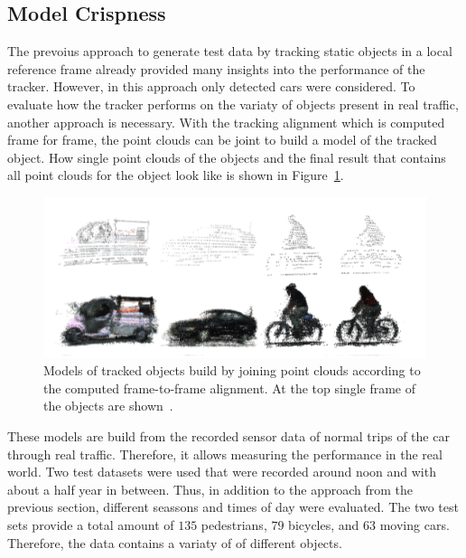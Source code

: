 \documentclass[twoside,a4paper,article]{combine}
\begin{document}
\subsection{Model Crispness}
\label{sub:model-crispness}
The prevoius approach to generate test data by tracking static
objects in a local reference frame already provided many insights into
the performance of the tracker. However, in this approach only
detected cars were considered. To evaluate how the tracker performs
on the variaty of objects present in real traffic, another approach is
necessary. With the tracking alignment which is computed frame for
frame, the point clouds can be joint to build a model of the tracked
object. How single point clouds of the objects and the final result
that contains all point clouds for the object look like is shown in
Figure~\ref{fig:build-models}.
\begin{figure}
  \center
  \includegraphics[width=.7\linewidth]{build-models}
  \caption{Models of tracked objects build by joining point clouds
    according to the computed frame-to-frame alignment. At the top
    single frame of the objects are shown~\cite{paper}.}
  \label{fig:build-models}
\end{figure}
These models are build from the recorded sensor data of normal trips
of the car through real traffic. Therefore, it allows measuring the
performance in the real world. Two test datasets were used that were
recorded around noon and with about a half year in between. Thus, in
addition to the approach from the previous section, different seassons
and times of day were evaluated. The two test sets provide a total
amount of $135$ pedestrians, $79$ bicycles, and $63$ moving
cars. Therefore, the data contains a variaty of of different objects.
\end{document}
